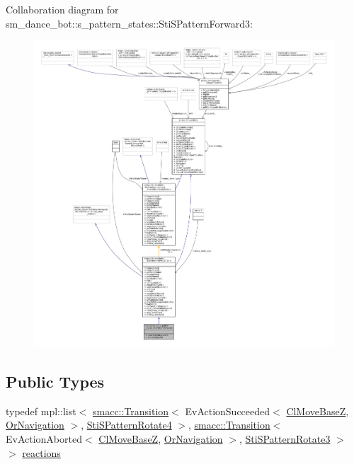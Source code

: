 Collaboration diagram for sm\+\_\+dance\+\_\+bot\+:\+:s\+\_\+pattern\+\_\+states\+:\+:Sti\+S\+Pattern\+Forward3\+:
\nopagebreak
\begin{figure}[H]
\begin{center}
\leavevmode
\includegraphics[width=350pt]{structsm__dance__bot_1_1s__pattern__states_1_1StiSPatternForward3__coll__graph}
\end{center}
\end{figure}
\subsection*{Public Types}
\begin{DoxyCompactItemize}
\item 
typedef mpl\+::list$<$ \hyperlink{classsmacc_1_1Transition}{smacc\+::\+Transition}$<$ Ev\+Action\+Succeeded$<$ \hyperlink{classmove__base__z__client_1_1ClMoveBaseZ}{Cl\+Move\+BaseZ}, \hyperlink{classsm__dance__bot_1_1OrNavigation}{Or\+Navigation} $>$, \hyperlink{structsm__dance__bot_1_1s__pattern__states_1_1StiSPatternRotate4}{Sti\+S\+Pattern\+Rotate4} $>$, \hyperlink{classsmacc_1_1Transition}{smacc\+::\+Transition}$<$ Ev\+Action\+Aborted$<$ \hyperlink{classmove__base__z__client_1_1ClMoveBaseZ}{Cl\+Move\+BaseZ}, \hyperlink{classsm__dance__bot_1_1OrNavigation}{Or\+Navigation} $>$, \hyperlink{structsm__dance__bot_1_1s__pattern__states_1_1StiSPatternRotate3}{Sti\+S\+Pattern\+Rotate3} $>$ $>$ \hyperlink{structsm__dance__bot_1_1s__pattern__states_1_1StiSPatternForward3_ad0d5134c584a97e028442758b0ce3283}{reactions}
\end{DoxyCompactItemize}
